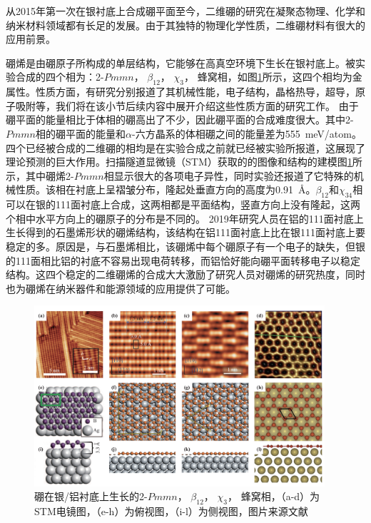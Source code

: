 从2015年第一次在银衬底上合成硼平面至今，二维硼的研究在凝聚态物理、化学和纳米材料领域都有长足的发展。由于其独特的物理化学性质，二维硼材料有很大的应用前景。

硼烯是由硼原子所构成的单层结构，它能够在高真空环境下生长在银衬底上\cite{zhang2015two}。被实验合成的四个相为：2-$Pmmn$， $\beta_{12}$， $\chi_3$， 蜂窝相，如图\ref{fig:boron4phase}所示，这四个相均为金属性。性质方面，有研究分别报道了其机械性能，电子结构，晶格热导，超导，原子吸附等\cite{penev2016can, xu2016nucleation, lopez2016electronic, peng2016electronic, carrete2016physically, wang2016strain, xiao2016enhanced, gao2017prediction, liu2016stable, yang2008ab, zabolotskiy2016strain, yuan2015effect, liu2013boron, zhang2016borophene, shu2016unveiling}，我们将在该小节后续内容中展开介绍这些性质方面的研究工作。
由于硼平面的能量相比于体相的硼高出了不少，因此硼平面的合成难度很大。其中2-$Pmmn$相的硼平面的能量和$\alpha$-六方晶系的体相硼之间的能量差为\SI{555}{\meV/atom}\cite{lherbier2016electronic}。四个已经被合成的二维硼的相均是在实验合成之前就已经被实验所报道，这展现了理论预测的巨大作用。扫描隧道显微镜（STM）获取的的图像和结构的建模图\ref{fig:boron4phase}所示，其中硼烯2-$Pmmn$相显示很大的各项电子异性，同时实验还报道了它特殊的机械性质。该相在衬底上呈褶皱分布，隆起处垂直方向的高度为\SI{0.91}{\angstrom}。$\beta_{12}$和$\chi_34$相可以在银的111面衬底上合成，这两相都是平面结构，竖直方向上没有隆起，这两个相中水平方向上的硼原子的分布是不同的。
2019年研究人员在铝的111面衬底上生长得到的石墨烯形状的硼烯结构\cite{li2018experimental}，该结构在铝111面衬底上比在银111面衬底上要稳定的多。原因是，与石墨烯相比，该硼烯中每个硼原子有一个电子的缺失，但银的111面相比铝的衬底不容易出现电荷转移，而铝恰好能向硼平面转移电子以稳定结构。这四个稳定的二维硼烯的合成大大激励了研究人员对硼烯的研究热度，同时也为硼烯在纳米器件和能源领域的应用提供了可能。

\begin{figure}
  \includegraphics[width=0.96\textwidth]{figs/ch1_boron4phase.png}
  \centering
  \caption{硼在银/铝衬底上生长的2-$Pmmn$， $\beta_{12}$， $\chi_3$， 蜂窝相，（a-d）为STM电镜图，（e-h）为俯视图，（i-l）为侧视图，图片来源文献\cite{mannix2015synthesis,li2018experimental,feng2016experimental}}
  \label{fig:boron4phase}
\end{figure}


